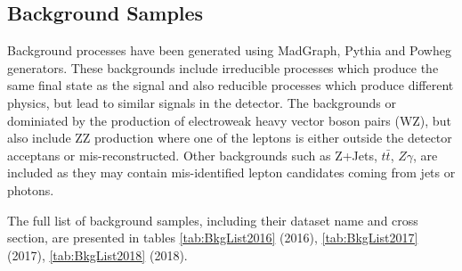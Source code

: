 \subsection{Background Samples}

Background processes have been generated using MadGraph, Pythia and Powheg
generators. These backgrounds include irreducible processes which produce the
same final state as the signal and also reducible processes which produce
different physics, but lead to similar signals in the detector. The backgrounds
or dominiated by the production of electroweak heavy vector boson pairs (WZ), but
also include ZZ production where one of the leptons is either outside the detector
acceptans or mis-reconstructed. Other backgrounds such as Z+Jets, $t\bar{t}$,
$Z\gamma$, are included as they may contain mis-identified lepton candidates
coming from jets or photons.

The full list of background samples, including their dataset name and cross
section, are presented in tables \ref{tab:BkgList2016} (2016),
\ref{tab:BkgList2017}(2017), \ref{tab:BkgList2018} (2018).

